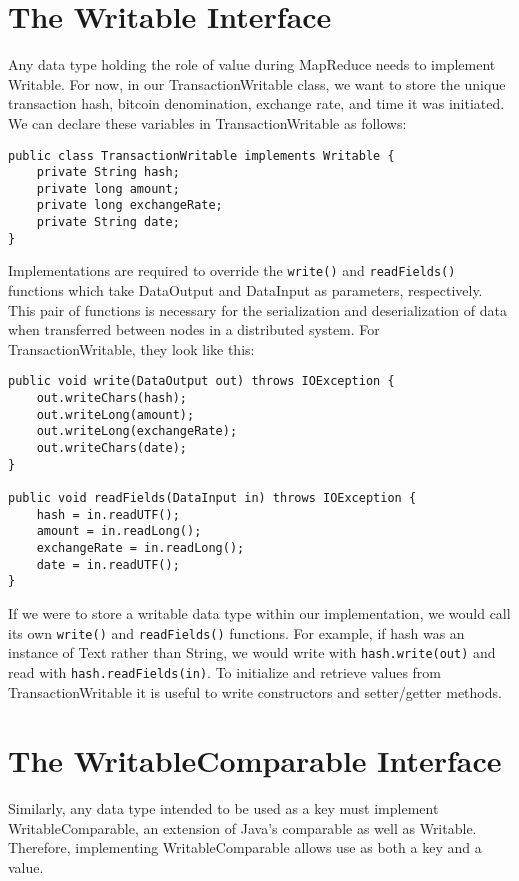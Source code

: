 \documentclass[9pt,twocolumn,twoside]{idsi}
\begin{document}
\section{The Writable Interface}

Any data type holding the role of value during MapReduce needs to implement Writable. For now, in our TransactionWritable class, we want to store the unique transaction hash, bitcoin denomination, exchange rate, and time it was initiated. We can declare these variables in TransactionWritable as follows:

\begin{lstlisting}
public class TransactionWritable implements Writable {
    private String hash;
    private long amount;
    private long exchangeRate;
    private String date;
}
\end{lstlisting}

Implementations are required to override the \lstinline{write()} and \lstinline{readFields()} functions which take DataOutput and DataInput as parameters, respectively. This pair of functions is necessary for the serialization and deserialization of data when  transferred between nodes in a distributed system. For TransactionWritable, they look like this:

\begin{lstlisting}
public void write(DataOutput out) throws IOException {
    out.writeChars(hash);
    out.writeLong(amount);
    out.writeLong(exchangeRate);
    out.writeChars(date);
}

public void readFields(DataInput in) throws IOException {
    hash = in.readUTF();
    amount = in.readLong();
    exchangeRate = in.readLong();
    date = in.readUTF();
}
\end{lstlisting}

If we were to store a writable data type within our implementation, we would call its own \lstinline{write()} and \lstinline{readFields()} functions. For example, if hash was an instance of Text rather than String, we would write with \lstinline{hash.write(out)} and read with \lstinline{hash.readFields(in)}. To initialize and retrieve values from TransactionWritable it is useful to write constructors and setter/getter methods.

\section{The WritableComparable Interface}

Similarly, any data type intended to be used as a key must implement WritableComparable, an extension of Java's comparable as well as Writable. Therefore, implementing WritableComparable allows use as both a key and a value.
\end{document}
